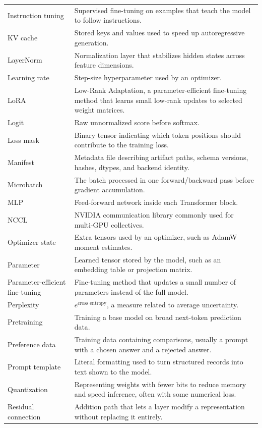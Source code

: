 \begin{longtable}{p{}p{}}
Instruction tuning & Supervised fine-tuning on examples that teach the model to follow instructions. \\
KV cache & Stored keys and values used to speed up autoregressive generation. \\
LayerNorm & Normalization layer that stabilizes hidden states across feature dimensions. \\
Learning rate & Step-size hyperparameter used by an optimizer. \\
LoRA & Low-Rank Adaptation, a parameter-efficient fine-tuning method that learns small low-rank updates to selected weight matrices. \\
Logit & Raw unnormalized score before softmax. \\
Loss mask & Binary tensor indicating which token positions should contribute to the training loss. \\
Manifest & Metadata file describing artifact paths, schema versions, hashes, dtypes, and backend identity. \\
Microbatch & The batch processed in one forward/backward pass before gradient accumulation. \\
MLP & Feed-forward network inside each Transformer block. \\
NCCL & NVIDIA communication library commonly used for multi-GPU collectives. \\
Optimizer state & Extra tensors used by an optimizer, such as AdamW moment estimates. \\
Parameter & Learned tensor stored by the model, such as an embedding table or projection matrix. \\
Parameter-efficient fine-tuning & Fine-tuning method that updates a small number of parameters instead of the full model. \\
Perplexity & \(e^{\text{cross entropy}}\), a measure related to average uncertainty. \\
Pretraining & Training a base model on broad next-token prediction data. \\
Preference data & Training data containing comparisons, usually a prompt with a chosen answer and a rejected answer. \\
Prompt template & Literal formatting used to turn structured records into text shown to the model. \\
Quantization & Representing weights with fewer bits to reduce memory and speed inference, often with some numerical loss. \\
Residual connection & Addition path that lets a layer modify a representation without replacing it entirely. \\

\end{longtable}
